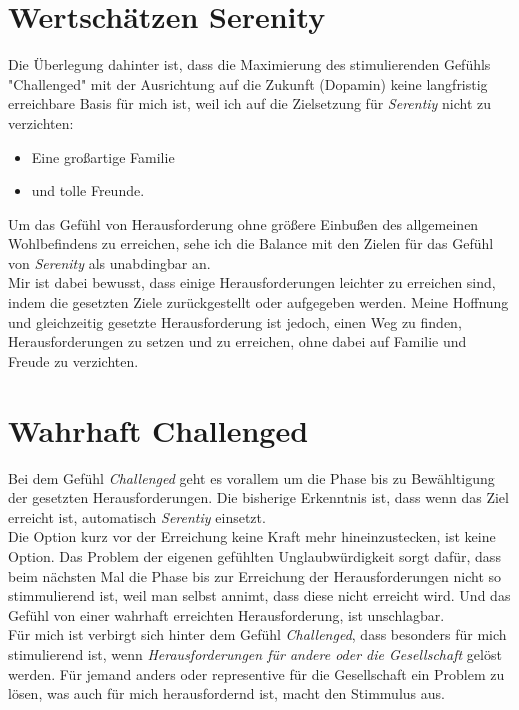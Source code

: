 \section{Wertschätzen Serenity}

Die Überlegung dahinter ist, dass die Maximierung des stimulierenden Gefühls "Challenged" mit der Ausrichtung auf die Zukunft (Dopamin) keine langfristig erreichbare Basis für mich ist, weil ich auf die Zielsetzung für \textit{Serentiy} nicht zu verzichten:
\begin{itemize}
    \item Eine großartige Familie
    \item und tolle Freunde.
\end{itemize}
Um das Gefühl von Herausforderung ohne größere Einbußen des allgemeinen Wohlbefindens zu erreichen, sehe ich die Balance mit den Zielen für das Gefühl von  \textit{Serenity} als unabdingbar an.\\

Mir ist dabei bewusst, dass einige Herausforderungen leichter zu erreichen sind, indem die gesetzten Ziele zurückgestellt oder aufgegeben werden. Meine Hoffnung und gleichzeitig gesetzte Herausforderung ist jedoch, einen Weg zu finden, Herausforderungen zu setzen und zu erreichen, ohne dabei auf Familie und Freude zu verzichten. 

\section{Wahrhaft Challenged}
Bei dem Gefühl \textit{Challenged} geht es vorallem um die Phase bis zu Bewähltigung der gesetzten Herausforderungen. Die bisherige Erkenntnis ist, dass wenn das Ziel erreicht ist, automatisch \textit{Serentiy} einsetzt.\\

Die Option kurz vor der Erreichung keine Kraft mehr hineinzustecken, ist keine Option. Das Problem der eigenen gefühlten Unglaubwürdigkeit sorgt dafür, dass beim nächsten Mal die Phase bis zur Erreichung der Herausforderungen nicht so stimmulierend ist, weil man selbst annimt, dass diese nicht erreicht wird. Und das Gefühl von einer wahrhaft erreichten Herausforderung, ist unschlagbar.\\

Für mich ist verbirgt sich hinter dem Gefühl \textit{Challenged}, dass besonders für mich stimulierend ist, wenn \textit{Herausforderungen für andere oder die Gesellschaft} gelöst werden. Für jemand anders oder representive für die Gesellschaft ein Problem zu lösen, was auch für mich herausfordernd ist, macht den Stimmulus aus.\\

